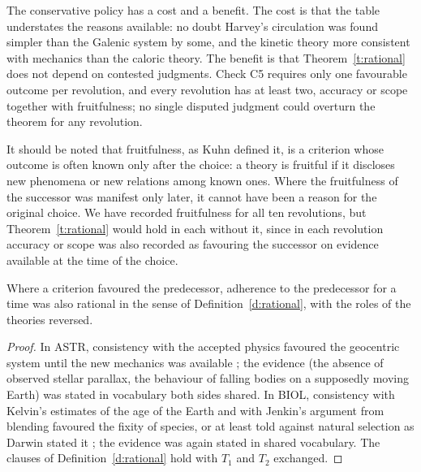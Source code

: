 \documentclass{situationist-preprint}
\begin{document}
The conservative policy has a cost and a benefit. The cost is that the table understates the reasons available: no doubt Harvey's circulation was found simpler than the Galenic system by some, and the kinetic theory more consistent with mechanics than the caloric theory. The benefit is that Theorem~\ref{t:rational} does not depend on contested judgments. Check C5 requires only one favourable outcome per revolution, and every revolution has at least two, accuracy or scope together with fruitfulness; no single disputed judgment could overturn the theorem for any revolution.

It should be noted that fruitfulness, as Kuhn defined it, is a criterion whose outcome is often known only after the choice: a theory is fruitful if it discloses new phenomena or new relations among known ones. Where the fruitfulness of the successor was manifest only later, it cannot have been a reason for the original choice. We have recorded fruitfulness for all ten revolutions, but Theorem~\ref{t:rational} would hold in each without it, since in each revolution accuracy or scope was also recorded as favouring the successor on evidence available at the time of the choice.

\begin{proposition}\label{p:dissent}
Where a criterion favoured the predecessor, adherence to the predecessor for a time was also rational in the sense of Definition~\ref{d:rational}, with the roles of the theories reversed.
\end{proposition}

\begin{proof}
In ASTR, consistency with the accepted physics favoured the geocentric system until the new mechanics was available \citep{Kuhn1957,Kuhn1977}; the evidence (the absence of observed stellar parallax, the behaviour of falling bodies on a supposedly moving Earth) was stated in vocabulary both sides shared. In BIOL, consistency with Kelvin's estimates of the age of the Earth and with Jenkin's argument from blending favoured the fixity of species, or at least told against natural selection as Darwin stated it \citep{Ruse1979}; the evidence was again stated in shared vocabulary. The clauses of Definition~\ref{d:rational} hold with $T_1$ and $T_2$ exchanged.
\end{proof}
\end{document}
